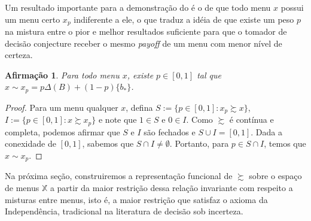 \documentclass[11pt, a4paper]{article}
\theoremstyle{nonumberplain}
\newtheorem{proof}{Dem.}
\theoremstyle{plain}
\theoremstyle{plain}
\newtheorem{claim}{Afirmação}
\theoremstyle{plain}
\theoremstyle{nonumberplain}
\begin{document}
Um resultado importante para a demonstração do  é o de que todo menu $x$ possui um menu certo $x_p$ indiferente a ele, o que traduz a idéia de que existe um peso $p$ na mistura entre o pior e melhor resultados suficiente para que o tomador de decisão conjecture receber o mesmo \emph{payoff} de um menu com menor nível de certeza.
\begin{claim}Para todo menu $x$, existe $p\in[0,1]$ tal que $x\sim x_p=p\Delta(B)+(1-p)\{b_*\}$. \end{claim}
\begin{proof}
Para um menu qualquer $x$, defina $S:=\{p\in[0,1] : x_p\succsim x\}$, $I:=\{p\in[0,1] : x\succsim x_p\}$ e note que $1\in S$ e $0\in I$. Como $\succsim$ é contínua e completa, podemos afirmar que $S$ e $I$ são fechados e $S\cup I=[0,1]$. Dada a conexidade de $[0,1]$, sabemos que $S\cap I\neq \emptyset$. Portanto, para $p\in S\cap I$, temos que $x\sim x_p$.
\end{proof}
Na próxima seção, construiremos a representação funcional de $\succsim$ sobre o espaço de menus $\mathbb{X}$ a partir da maior restrição dessa relação invariante com respeito a misturas entre menus, isto é, a maior restrição que satisfaz o axioma da Independência, tradicional na literatura de decisão sob incerteza.
\end{document}
